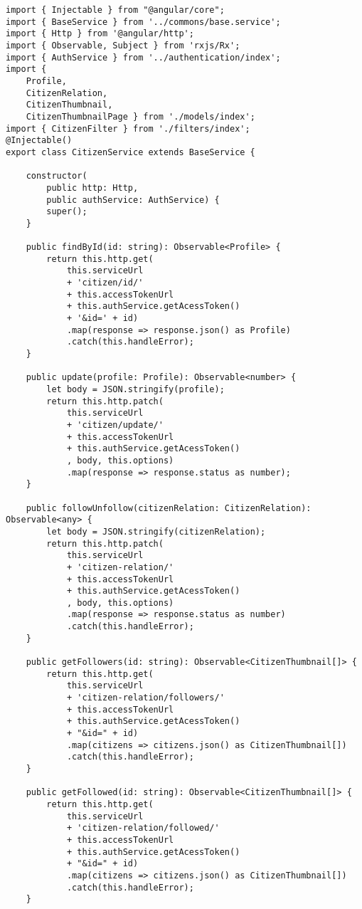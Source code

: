 \begin {lstlisting}
import { Injectable } from "@angular/core";
import { BaseService } from '../commons/base.service';
import { Http } from '@angular/http';
import { Observable, Subject } from 'rxjs/Rx';
import { AuthService } from '../authentication/index';
import { 
    Profile, 
    CitizenRelation, 
    CitizenThumbnail,
    CitizenThumbnailPage } from './models/index';
import { CitizenFilter } from './filters/index';
@Injectable()
export class CitizenService extends BaseService {

    constructor(
        public http: Http,
        public authService: AuthService) {
        super();
    }

    public findById(id: string): Observable<Profile> {
        return this.http.get(
            this.serviceUrl
            + 'citizen/id/'
            + this.accessTokenUrl
            + this.authService.getAcessToken()
            + '&id=' + id)
            .map(response => response.json() as Profile)
            .catch(this.handleError);
    }

    public update(profile: Profile): Observable<number> {
        let body = JSON.stringify(profile);
        return this.http.patch(
            this.serviceUrl
            + 'citizen/update/'
            + this.accessTokenUrl
            + this.authService.getAcessToken()
            , body, this.options)
            .map(response => response.status as number);
    }

    public followUnfollow(citizenRelation: CitizenRelation): Observable<any> {
        let body = JSON.stringify(citizenRelation);
        return this.http.patch(
            this.serviceUrl
            + 'citizen-relation/'
            + this.accessTokenUrl
            + this.authService.getAcessToken()
            , body, this.options)
            .map(response => response.status as number)
            .catch(this.handleError);
    }

    public getFollowers(id: string): Observable<CitizenThumbnail[]> {
        return this.http.get(
            this.serviceUrl
            + 'citizen-relation/followers/'
            + this.accessTokenUrl
            + this.authService.getAcessToken()
            + "&id=" + id)
            .map(citizens => citizens.json() as CitizenThumbnail[])
            .catch(this.handleError);
    }

    public getFollowed(id: string): Observable<CitizenThumbnail[]> {
        return this.http.get(
            this.serviceUrl
            + 'citizen-relation/followed/'
            + this.accessTokenUrl
            + this.authService.getAcessToken()
            + "&id=" + id)
            .map(citizens => citizens.json() as CitizenThumbnail[])
            .catch(this.handleError);
    }


\end{lstlisting}

